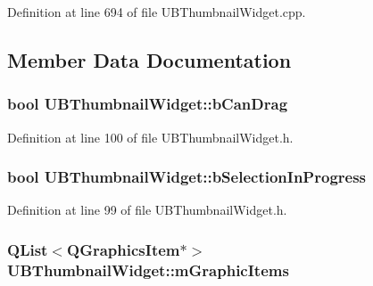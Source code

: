 Definition at line 694 of file U\-B\-Thumbnail\-Widget.\-cpp.



\subsection{Member Data Documentation}
\hypertarget{class_u_b_thumbnail_widget_ae00409bc4f70482e57523e94583de713}{
\subsubsection[{b\-Can\-Drag}]{\setlength{\rightskip}{0pt plus 5cm}bool U\-B\-Thumbnail\-Widget\-::b\-Can\-Drag\hspace{0.3cm}{\ttfamily [protected]}}}\label{d2/d7e/class_u_b_thumbnail_widget_ae00409bc4f70482e57523e94583de713}


Definition at line 100 of file U\-B\-Thumbnail\-Widget.\-h.

\hypertarget{class_u_b_thumbnail_widget_ab67c3d09d08d5aa28a3fcd2776afb240}{
\subsubsection[{b\-Selection\-In\-Progress}]{\setlength{\rightskip}{0pt plus 5cm}bool U\-B\-Thumbnail\-Widget\-::b\-Selection\-In\-Progress\hspace{0.3cm}{\ttfamily [protected]}}}\label{d2/d7e/class_u_b_thumbnail_widget_ab67c3d09d08d5aa28a3fcd2776afb240}


Definition at line 99 of file U\-B\-Thumbnail\-Widget.\-h.

\hypertarget{class_u_b_thumbnail_widget_a43bfe498d5772daba93bdd852b8d4fa3}{
\subsubsection[{m\-Graphic\-Items}]{\setlength{\rightskip}{0pt plus 5cm}Q\-List$<$Q\-Graphics\-Item$\ast$$>$ U\-B\-Thumbnail\-Widget\-::m\-Graphic\-Items\hspace{0.3cm}{\ttfamily [protected]}}}\label{d2/d7e/class_u_b_thumbnail_widget_a43bfe498d5772daba93bdd852b8d4fa3}



